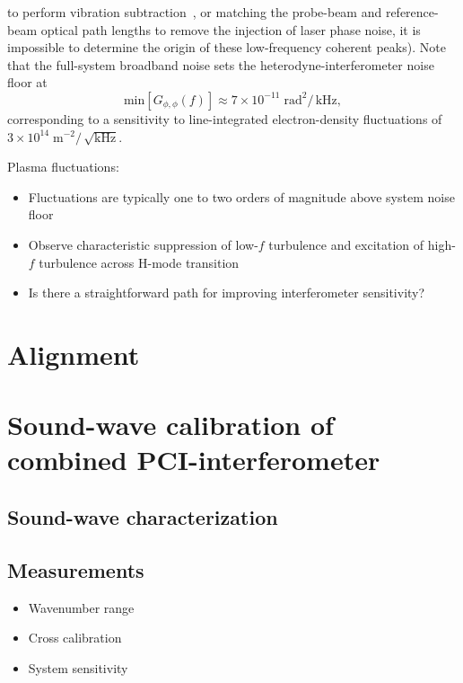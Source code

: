 to perform vibration subtraction~\cite{carlstrom_rsi88}, or
matching the probe-beam and reference-beam optical path lengths
to remove the injection of laser phase noise,
it is impossible to determine the origin
of these low-frequency coherent peaks).
Note that the full-system broadband noise
sets the heterodyne-interferometer noise floor at
\begin{equation}
  \text{min} \left[ G_{\phi,\phi}(f) \right]
  \approx
  7 \times 10^{-11} \; \text{rad}^2 / \, \text{kHz},
  \label{eq:Implementation:noise_floor_rad2_per_Hz}
\end{equation}
corresponding to a sensitivity
to line-integrated electron-density fluctuations of
$3 \times 10^{14} \; \text{m}^{-2} / \, \sqrt{\text{kHz}}$.

Plasma fluctuations:
\begin{itemize}
  \item Fluctuations are typically one to two orders of magnitude
    above system noise floor
  \item Observe characteristic suppression of low-$f$ turbulence
    and excitation of high-$f$ turbulence across H-mode transition
  \item Is there a straightforward path for improving interferometer
    sensitivity?
\end{itemize}


\section{Alignment}
\label{sec:Implementation:Alignment}
\section{Sound-wave calibration of combined PCI-interferometer}
\subsection{Sound-wave characterization}
\subsection{Measurements}
\begin{itemize}
  \item Wavenumber range
  \item Cross calibration
  \item System sensitivity
\end{itemize}

